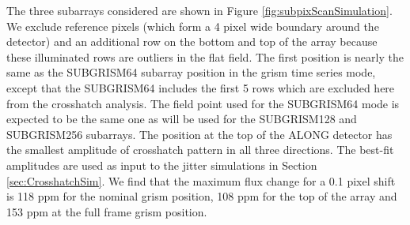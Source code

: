 \documentclass{aastex62}
\begin{document}
The three subarrays considered are shown in Figure \ref{fig:subpixScanSimulation}.
We exclude reference pixels (which form a 4 pixel wide boundary around the detector) and an additional row on the bottom and top of the array because these illuminated rows are outliers in the flat field.
The first position is nearly the same as the SUBGRISM64 subarray position in the grism time series mode, except that the SUBGRISM64 includes the first 5 rows which are excluded here from the crosshatch analysis.
The field point used for the SUBGRISM64 mode is expected to be the same one as will be used for the SUBGRISM128 and SUBGRISM256 subarrays.
The position at the top of the ALONG detector has the smallest amplitude of crosshatch pattern in all three directions.
The best-fit amplitudes are used as input to the jitter simulations in Section \ref{sec:CrosshatchSim}.
We find that the maximum flux change for a 0.1 pixel shift is 118 ppm for the nominal grism position, 108 ppm for the top of the array and 153 ppm at the full frame grism position.
\end{document}
